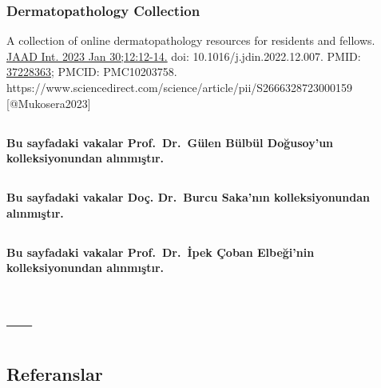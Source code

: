 \documentclass[
  letterpaper,
  DIV=11,
  numbers=noendperiod]{scrreprt}
\newlength{\cslhangindent}
\newlength{\cslentryspacingunit} %
\newenvironment{CSLReferences}[2] %
 {%
  \setlength{\parindent}{0pt}
  \ifodd #1
  \let\oldpar\par
  \def\par{\hangindent=\cslhangindent\oldpar}
  \fi
  \setlength{\parskip}{#2\cslentryspacingunit}
 }%
 {}
\begin{document}
\hypertarget{dermatopathology-collection}{%
\section{Dermatopathology
Collection}\label{dermatopathology-collection}}

A collection of online dermatopathology resources for residents and
fellows.
\href{https://www.jaadinternational.org/article/S2666-3287(23)00015-9/fulltext}{JAAD
Int. 2023 Jan 30;12:12-14.} doi: 10.1016/j.jdin.2022.12.007. PMID:
\href{https://pubmed.ncbi.nlm.nih.gov/37228363/}{37228363}; PMCID:
PMC10203758.
https://www.sciencedirect.com/science/article/pii/S2666328723000159
{[}@Mukosera2023{]}

\hypertarget{section-2}{%
\chapter{}\label{section-2}}

\textbf{Bu sayfadaki vakalar Prof.~Dr.~Gülen Bülbül Doğusoy'un
kolleksiyonundan alınmıştır.}

\hypertarget{section-3}{%
\chapter{}\label{section-3}}

\textbf{Bu sayfadaki vakalar Doç. Dr.~Burcu Saka'nın kolleksiyonundan
alınmıştır.}

\hypertarget{section-4}{%
\chapter{}\label{section-4}}

\textbf{Bu sayfadaki vakalar Prof.~Dr.~İpek Çoban Elbeği'nin
kolleksiyonundan alınmıştır.}

\part{---}


\hypertarget{referanslar}{%
\chapter*{Referanslar}\label{referanslar}}


\hypertarget{refs}{}
\begin{CSLReferences}{0}{0}
\end{CSLReferences}
\end{document}
